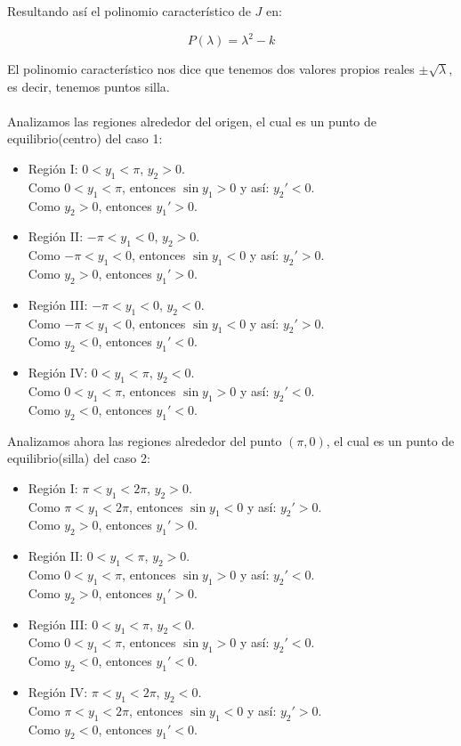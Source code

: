 \documentclass[10pt,letterpaper,titlepage]{article}
\begin{document}
Resultando as\'i el polinomio caracter\'istico de $J$ en:

\begin{equation}
	P(\lambda) = \lambda ^{2} - k
\end{equation}

El polinomio caracter\'istico nos dice que tenemos dos valores propios reales $\pm \sqrt{\lambda}$, es decir, tenemos puntos silla.\\\\
Analizamos las regiones alrededor del origen, el cual es un punto de equilibrio(centro) del caso 1:

\begin{itemize}
	\item Regi\'on I: $0<y_{1}< \pi$, $y_{2}>0$.\\
		Como $0<y_{1}< \pi$, entonces $\sin y_{1} > 0$ y as\'i: $y_{2}' <0$.\\
		Como $y_{2}>0$, entonces $y_{1}'>0$.
	\item Regi\'on II: $- \pi<y_{1}< 0$, $y_{2}>0$.\\
		Como $- \pi<y_{1}< 0$, entonces $\sin y_{1} < 0$ y as\'i: $y_{2}' >0$.\\
		Como $y_{2}>0$, entonces $y_{1}'>0$.
	\item Regi\'on III: $- \pi<y_{1}< 0$, $y_{2}<0$.\\
		Como $- \pi<y_{1}< 0$, entonces $\sin y_{1} < 0$ y as\'i: $y_{2}' >0$.\\
		Como $y_{2}<0$, entonces $y_{1}'<0$.
	\item Regi\'on IV: $0<y_{1}< \pi$, $y_{2}<0$.\\
		Como $0<y_{1}< \pi$, entonces $\sin y_{1} > 0$ y as\'i: $y_{2}' <0$.\\
		Como $y_{2}<0$, entonces $y_{1}'<0$.
\end{itemize}

Analizamos ahora las regiones alrededor del punto $(\pi,0)$, el cual es un punto de equilibrio(silla) del caso 2:

\begin{itemize}
	\item Regi\'on I: $\pi<y_{1}< 2\pi$, $y_{2}>0$.\\
		Como $\pi<y_{1}< 2\pi$, entonces $\sin y_{1} < 0$ y as\'i: $y_{2}' >0$.\\
		Como $y_{2}>0$, entonces $y_{1}'>0$.
	\item Regi\'on II: $0<y_{1}< \pi$, $y_{2}>0$.\\
		Como $0<y_{1}< \pi$, entonces $\sin y_{1} > 0$ y as\'i: $y_{2}' <0$.\\
		Como $y_{2}>0$, entonces $y_{1}'>0$.
	\item Regi\'on III: $0<y_{1}< \pi$, $y_{2}<0$.\\
		Como $0<y_{1}< \pi$, entonces $\sin y_{1} > 0$ y as\'i: $y_{2}' <0$.\\
		Como $y_{2}<0$, entonces $y_{1}'<0$.
	\item Regi\'on IV: $\pi<y_{1}< 2\pi$, $y_{2}<0$.\\
		Como $\pi<y_{1}< 2\pi$, entonces $\sin y_{1} < 0$ y as\'i: $y_{2}' >0$.\\
		Como $y_{2}<0$, entonces $y_{1}'<0$.
\end{itemize}
\end{document}
